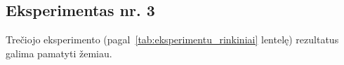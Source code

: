 \subsection{Eksperimentas nr. 3}
\label{subsec:eksperimentas_nr_3}

Trečiojo eksperimento (pagal~\ref{tab:eksperimentu_rinkiniai} lentelę) rezultatus galima pamatyti žemiau.

